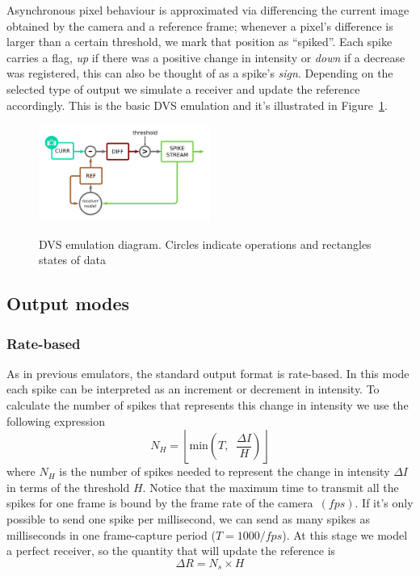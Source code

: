 \documentclass[twocolumn]{article}
\begin{document}
Asynchronous pixel behaviour is approximated via differencing the current image obtained by the camera and a reference frame; whenever a pixel's difference is larger than a certain threshold, we mark that position as ``spiked''. Each spike carries a flag, \textit{up} if there was a positive change in intensity or \textit{down} if a decrease was registered, this can also be thought of as a spike's \textit{sign}. Depending on the selected type of output we simulate a receiver and update the reference accordingly. This is the basic DVS emulation and it's illustrated in Figure~\ref{fig:dvs_emu}.

\begin{figure}[htb]
  \includegraphics[width=0.5\textwidth]{dvs_emu}
  \label{fig:dvs_emu}
  \caption{DVS emulation diagram. Circles indicate operations and rectangles states of data}
\end{figure}

\subsection{Output modes}
\subsubsection{Rate-based}
As in previous emulators\cite{dvs_emu}, the standard output format is rate-based. In this mode each spike can be interpreted as an increment or decrement in intensity. To calculate the number of spikes that represents this change in intensity we use the following expression
\begin{equation}
  \label{eq:num_spikes_rate}
  N_{H} = \left\lfloor \mathrm{min}\left( T, \;\; \frac{\Delta I}{H} \right) \right\rfloor
\end{equation}
where $N_{H}$ is the number of spikes needed to represent the change in intensity $\Delta I$ in terms of the threshold $H$. Notice that the maximum time to transmit all the spikes for one frame is bound by the frame rate of the camera~$(fps)$. If it's only possible to send one spike per millisecond, we can send as many spikes as milliseconds in one frame-capture period ($T = 1000/fps$). At this stage we model a perfect receiver, so the quantity that will update the reference is
\begin{equation}
  \label{eq:ref_update}
  \Delta R = N_{s}\times H
\end{equation}
\end{document}
